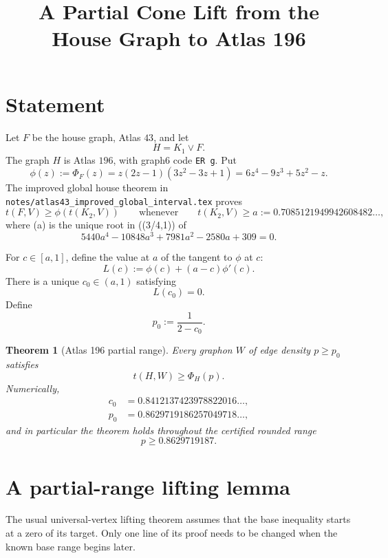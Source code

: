 \documentclass[11pt]{article}
\title{A Partial Cone Lift from the House Graph to Atlas 196}
\author{}
\date{}
\newtheorem{theorem}{Theorem}
\begin{document}
\maketitle

\section{Statement}

Let $F$ be the house graph, Atlas $43$, and let
\[
 H=K_1\vee F.
\]
The graph $H$ is Atlas $196$, with graph6 code \texttt{ER\string~g}.  Put
\[
 \phi(z):=\Phi_F(z)
 =z(2z-1)(3z^2-3z+1)
 =6z^4-9z^3+5z^2-z.
\]
The improved global house theorem in
\texttt{notes/atlas43\_improved\_global\_interval.tex} proves
\begin{equation}\label{eq:house-input}
 t(F,V)\geq\phi(t(K_2,V))
 \qquad\text{whenever}\qquad
 t(K_2,V)\geq
 a:=0.7085121949942608482\ldots,
\end{equation}
where (a) is the unique root in ((3/4,1)) of
\[
 5440a^4-10848a^3+7981a^2-2580a+309=0.
\]

For $c\in[a,1]$, define the value at $a$ of the tangent to $\phi$ at $c$:
\[
 L(c):=\phi(c)+(a-c)\phi'(c).
\]
There is a unique $c_0\in(a,1)$ satisfying
\begin{equation}\label{eq:c0}
 L(c_0)=0.
\end{equation}
Define
\begin{equation}\label{eq:p0}
 p_0:=\frac1{2-c_0}.
\end{equation}

\begin{theorem}[Atlas 196 partial range]\label{thm:atlas196}
Every graphon $W$ of edge density $p\geq p_0$ satisfies
\[
 t(H,W)\geq\Phi_H(p).
\]
Numerically,
\[
\begin{split}
 c_0&=0.8412137423978822016\ldots,\\
 p_0&=0.8629719186257049718\ldots,
\end{split}
\]
and in particular the theorem holds throughout the certified rounded range
\[
 \boxed{p\geq0.8629719187.}
\]
\end{theorem}

\section{A partial-range lifting lemma}

The usual universal-vertex lifting theorem assumes that the base inequality
starts at a zero of its target.  Only one line of its proof needs to be
changed when the known base range begins later.
\end{document}
